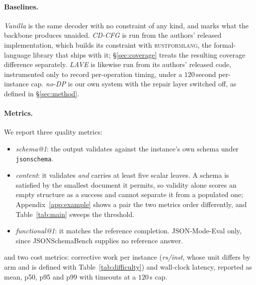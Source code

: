 \documentclass{article}
\begin{document}
\paragraph{Baselines.}
\emph{Vanilla} is the same decoder with no constraint of any kind, and marks
what the backbone produces unaided. \emph{CD-CFG} \citep{cd4dllm} is run from the
authors' released implementation, which builds its constraint with
\textsc{rustformlang}, the formal-language library that ships with it; \S\ref{sec:coverage}
treats the resulting coverage difference separately. \emph{LAVE}
\citep{zhang2026lookaheadthenverifyreliableconstraineddecoding} is likewise run
from its authors' released code, instrumented only to record per-operation
timing, under a $120$\,second per-instance cap.
\emph{no-DP} is our own system with the repair layer switched off, as defined in
\S\ref{sec:method}.


\paragraph{Metrics.}
We report three quality metrics:
\begin{itemize}[leftmargin=1.4em,itemsep=1pt,topsep=2pt]
\item \emph{schema@1}: the output validates against the instance's own schema
      under \texttt{jsonschema}.
\item \emph{content}: it validates \emph{and} carries at least five scalar
      leaves. A schema is satisfied by the smallest document it permits, so
      validity alone scores an empty structure as a success and cannot separate
      it from a populated one; Appendix~\ref{app:example} shows a pair the two
      metrics order differently, and Table~\ref{tab:main} sweeps the threshold.
\item \emph{functional@1}: it matches the reference completion. JSON-Mode-Eval
      only, since JSONSchemaBench supplies no reference answer.
\end{itemize}
and two cost metrics: corrective work per instance (\emph{rs/inst}, whose unit
differs by arm and is defined with Table~\ref{tab:difficulty}) and wall-clock
latency, reported as mean, p50, p95 and p99 with timeouts at a $120$\,s cap.
\end{document}
